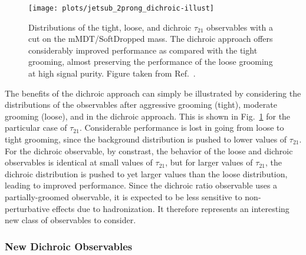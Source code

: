 \begin{figure}[t]
\begin{center}
\texttt{[image: plots/jetsub\_2prong\_dichroic-illust]}
\end{center}
\caption{Distributions of the tight, loose, and dichroic $\tau_{21}$ observables with a cut on the mMDT/SoftDropped mass. The dichroic approach offers considerably improved performance as compared with the tight grooming, almost preserving the performance of the loose grooming at high signal purity.  Figure taken from Ref.~\cite{Salam:2016yht}.}
\label{fig:SM_jetsub_2prong:dichroic_distribution}
\end{figure}

The benefits of the dichroic approach can simply be illustrated by
considering the distributions of the observables after aggressive
grooming (tight), moderate grooming (loose), and in the dichroic
approach.
%
This is shown in Fig.~\ref{fig:SM_jetsub_2prong:dichroic_distribution} for the particular case of $\tau_{21}$.
%
Considerable performance is lost in going from loose to tight grooming, since the background distribution is pushed to lower values of $\tau_{21}$.
%
For the dichroic observable, by constrast, the behavior of the loose
and dichroic observables is identical at small values of $\tau_{21}$,
but for larger values of $\tau_{21}$, the dichroic distribution is
pushed to yet larger values than the loose distribution, leading to
improved performance.
%
Since the dichroic ratio observable uses a partially-groomed
observable, it is expected to be less sensitive to non-perturbative effects due to hadronization.
%
It therefore represents an interesting new class of observables to consider. 

\subsubsection{New Dichroic Observables}\label{sec:SM_jetsub_2prong:dichroic_new}

